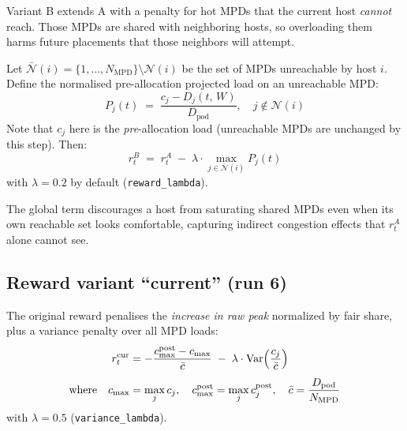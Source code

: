 \documentclass[11pt]{article}
\begin{document}
Variant B extends A with a penalty for hot MPDs that the current host
\emph{cannot} reach.  Those MPDs are shared with neighboring hosts, so
overloading them harms future placements that those neighbors will attempt.

Let $\bar{\mathcal{N}}(i) = \{1,\ldots,N_{\text{MPD}}\} \setminus \mathcal{N}(i)$
be the set of MPDs unreachable by host $i$.  Define the normalised pre-allocation
projected load on an unreachable MPD:
\begin{equation}
  P_j(t)
  \;=\;
  \frac{c_j - D_j(t,\,W)}{D_{\text{pod}}},
  \quad j \notin \mathcal{N}(i)
  \label{eq:Pj}
\end{equation}
Note that $c_j$ here is the \emph{pre}-allocation load (unreachable MPDs are
unchanged by this step).  Then:
\begin{equation}
  r_t^B
  \;=\;
  r_t^A
  \;-\;
  \lambda \cdot \max_{j \in \bar{\mathcal{N}}(i)} P_j(t)
  \label{eq:reward_B}
\end{equation}
with $\lambda = 0.2$ by default (\texttt{reward\_lambda}).

The global term discourages a host from saturating shared MPDs even when its
own reachable set looks comfortable, capturing indirect congestion effects that
$r_t^A$ alone cannot see.

\subsection*{Reward variant ``current'' (run 6)}

The original reward penalises the \emph{increase in raw peak} normalized by
fair share, plus a variance penalty over all MPD loads:
\begin{align}
  r_t^{\text{cur}}
  &= -\frac{c_{\max}^{\text{post}} - c_{\max}}{\bar{c}}
     \;-\;
     \lambda \cdot \mathrm{Var}\!\left(\frac{c_j}{\bar{c}}\right)
  \label{eq:reward_cur}
  \\[4pt]
  \text{where}\quad
  c_{\max} &= \max_j c_j,
  \quad
  c_{\max}^{\text{post}} = \max_j c_j^{\text{post}},
  \quad
  \bar{c} = \frac{D_{\text{pod}}}{N_{\text{MPD}}}
  \notag
\end{align}
with $\lambda = 0.5$ (\texttt{variance\_lambda}).
\end{document}
